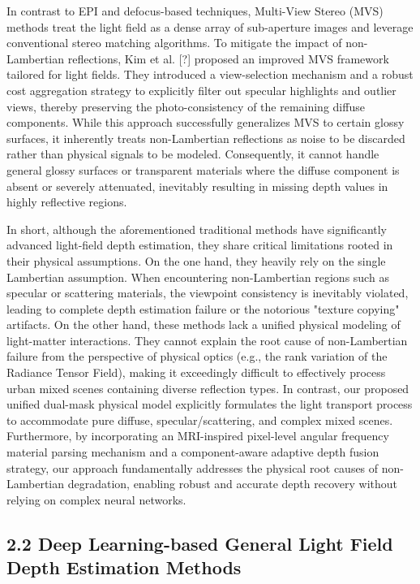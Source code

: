 In contrast to EPI and defocus-based techniques, Multi-View Stereo (MVS) methods treat the light field as a dense array of sub-aperture images and leverage conventional stereo matching algorithms. To mitigate the impact of non-Lambertian reflections, Kim et al. [?] proposed an improved MVS framework tailored for light fields. They introduced a view-selection mechanism and a robust cost aggregation strategy to explicitly filter out specular highlights and outlier views, thereby preserving the photo-consistency of the remaining diffuse components. While this approach successfully generalizes MVS to certain glossy surfaces, it inherently treats non-Lambertian reflections as noise to be discarded rather than physical signals to be modeled. Consequently, it cannot handle general glossy surfaces or transparent materials where the diffuse component is absent or severely attenuated, inevitably resulting in missing depth values in highly reflective regions.

In short, although the aforementioned traditional methods have significantly advanced light-field depth estimation, they share critical limitations rooted in their physical assumptions. On the one hand, they heavily rely on the single Lambertian assumption. When encountering non-Lambertian regions such as specular or scattering materials, the viewpoint consistency is inevitably violated, leading to complete depth estimation failure or the notorious "texture copying" artifacts. On the other hand, these methods lack a unified physical modeling of light-matter interactions. They cannot explain the root cause of non-Lambertian failure from the perspective of physical optics (e.g., the rank variation of the Radiance Tensor Field), making it exceedingly difficult to effectively process urban mixed scenes containing diverse reflection types. In contrast, our proposed unified dual-mask physical model explicitly formulates the light transport process to accommodate pure diffuse, specular/scattering, and complex mixed scenes. Furthermore, by incorporating an MRI-inspired pixel-level angular frequency material parsing mechanism and a component-aware adaptive depth fusion strategy, our approach fundamentally addresses the physical root causes of non-Lambertian degradation, enabling robust and accurate depth recovery without relying on complex neural networks.

\subsection{2.2 Deep Learning-based General Light Field Depth Estimation Methods}

